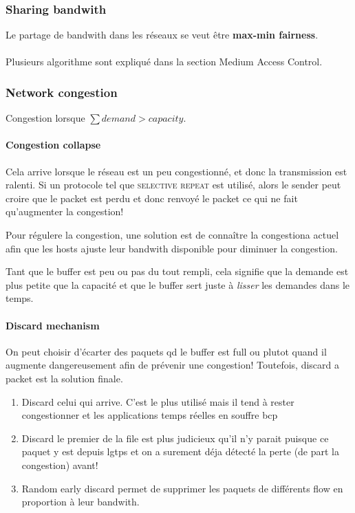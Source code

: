 \subsubsection{Sharing bandwith}

Le partage de bandwith dans les réseaux se veut être \textbf{max-min fairness}.

\paragraph{ }Plusieurs algorithme sont expliqué dans la section Medium Access Control.

\subsubsection{Network congestion}

Congestion lorsque $\sum demand > capacity$.

\paragraph{Congestion collapse}
Cela arrive lorsque le réseau est un peu congestionné, et donc la transmission est ralenti.
Si un protocole tel que \textsc{selective repeat} est utilisé, alors le sender peut
croire que le packet est perdu et donc renvoyé le packet ce qui ne fait qu'augmenter
la congestion!


Pour régulere la congestion, une solution est de connaître la congestiona actuel afin que
les hosts ajuste leur bandwith disponible pour diminuer la congestion.

Tant que le buffer est peu ou pas du tout rempli, cela signifie que la demande est plus
petite que la capacité et que le buffer sert juste à \textit{lisser} les demandes dans le temps.


\paragraph{Discard mechanism}
On peut choisir d'écarter des paquets qd le buffer est full ou plutot quand il
augmente dangereusement afin de prévenir une congestion!
Toutefois, discard a packet est la solution finale.

\begin{enumerate}
    \item Discard celui qui arrive. C'est le plus utilisé mais il tend à rester congestionner et
        les applications temps réelles en souffre bcp
    \item Discard le premier de la file est plus judicieux qu'il n'y parait puisque ce paquet
        y est depuis lgtps et on a surement déja détecté la perte (de part la congestion) avant!
    \item Random early discard permet de supprimer les paquets de différents flow en proportion
        à leur bandwith.
\end{enumerate}

